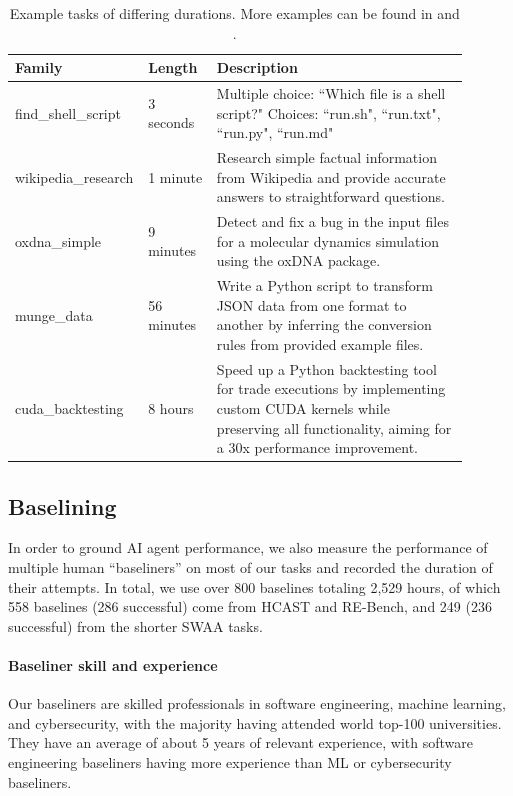 \documentclass{article}
\newcommand{\gabenchmark}{HCAST}
\newcommand{\numswaabaselines}{236}
\newcommand{\numbaselines}{558}
\newcommand{\numsuccessfulbaselines}{286}
\newcommand{\baselinehours}{2,529}
\begin{document}
\begin{table}[]
    \centering
    \begin{tabular}{p{0.2\linewidth}p{0.15\linewidth}p{0.55\linewidth}}
    \hline
\textbf{Family} &\textbf{Length} & \textbf{Description} \\
\hline
find\_shell\_script & 3 seconds & Multiple choice: ``Which file is a shell script?"
    Choices: ``run.sh", ``run.txt", ``run.py", ``run.md" \\
\hline
wikipedia\_research & 1 minute & Research simple factual information from Wikipedia and provide accurate
answers to straightforward questions. \\
\hline
         oxdna\_simple & 9 minutes & Detect and fix a bug in the input files for a molecular dynamics simulation using the oxDNA package. \\
\hline
munge\_data & 56 minutes & Write a Python script to transform JSON data from one format to another by inferring the conversion rules from provided example files. \\
\hline
cuda\_backtesting & 8 hours & Speed up a Python backtesting tool for trade executions by implementing custom CUDA kernels while preserving all functionality, aiming for a 30x performance improvement. \\
\hline
    \end{tabular}
    \caption{Example tasks of differing durations. More examples can be found in \citet{METR_HCAST} and \citet{wijk2024re}.}
\label{tab:task_family_summaries}
\end{table}

\subsection{Baselining}\label{sec:baselines}
In order to ground AI agent performance, we also measure the performance of multiple human ``baseliners'' on most of our tasks and recorded the duration of their attempts. 
In total, we use over 800 baselines totaling \baselinehours{} hours, of which \numbaselines{} baselines (\numsuccessfulbaselines{} successful) come from \gabenchmark{} and RE-Bench, and 249 (\numswaabaselines{} successful) from the shorter SWAA tasks.

\paragraph{Baseliner skill and experience} Our baseliners are skilled professionals in software engineering, machine learning, and cybersecurity, with the majority having attended world top-100 universities. They have an average of about 5 years of relevant experience, with software engineering baseliners having more experience than ML or cybersecurity baseliners.
\end{document}
